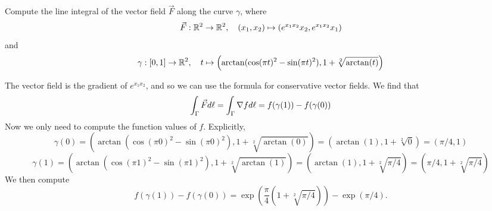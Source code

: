 \documentclass[11pt]{article}
\begin{document}
\begin{exercise}
    Compute the line integral of the vector field $\vec{F}$ along the curve $\gamma$, where 
    \[
        \vec F : \mathbb{R}^2 \to \mathbb{R}^2, \quad (x_1,x_2) \mapsto ( e^{ x_1x_2 } x_2, e^{ x_1 x_2 } x_1 )
    \]
    and 
    \[
        \gamma : [0,1] \to \mathbb{R}^2, \quad t \mapsto \left( \arctan( \cos(\pi t)^2 - \sin(\pi t)^2 ), 1 + \sqrt[2]{\arctan(t)} \right)
    \]
\end{exercise}
\begin{solution}
    The vector field is the gradient of $e^{ x_1 x_2 }$, and so we can use the formula for conservative vector fields.
    We find that
    \[
        \int_\Gamma \vec F d\ell = \int_\Gamma \nabla f d\ell = f(\gamma(1)) - f(\gamma(0))
    \]
    Now we only need to compute the function values of $f$. Explicitly,
    \[
        \gamma(0) = \left( \arctan( \cos(\pi 0)^2 - \sin(\pi 0)^2 ), 1 + \sqrt[2]{\arctan(0)} \right)
        =
        \left( \arctan( 1 ), 1 + \sqrt[2]{0} \right) 
        =
        \left( \pi/4, 1 \right)
    \]
    \[
        \gamma(1) = \left( \arctan( \cos(\pi 1)^2 - \sin(\pi 1)^2 ), 1 + \sqrt[2]{\arctan(1)} \right)
        =
        \left( \arctan( 1 ), 1 + \sqrt[2]{\pi/4} \right)
        =
        \left( \pi/4, 1 + \sqrt[2]{\pi/4} \right)
    \]
    We then compute
    \[
        f(\gamma(1)) - f(\gamma(0)) 
        =
        \exp\left( \frac \pi 4 ( 1 + \sqrt[2]{\pi/4} ) \right) - \exp\left( \pi/4 \right).
    \]
\end{solution}
\end{document}
